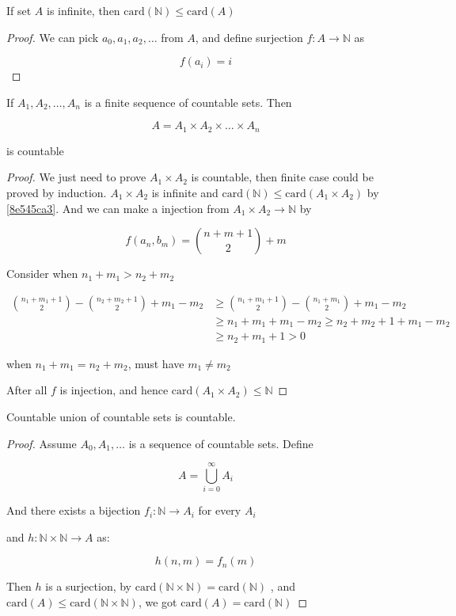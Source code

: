 \begin{thm}\label{8e545ca3}
    If set $A$ is infinite, then $\mathrm{card}(\mathbb{N}) \le \mathrm{card}(A)$
\end{thm}

\begin{proof}
    We can pick $a_0,a_1,a_2,\dots$ from $A$, and define surjection $f: A \to \mathbb{N}$ as

    \[
        f(a_i) = i
    \]
\end{proof}

\begin{thm}
    If $A_1,A_2,\dots, A_n$ is a finite sequence of countable sets. Then

    \[
        A = A_1 \times A_2 \times \dots \times A_n
    \]

    is countable
\end{thm}

\begin{proof}
    We just need to prove $A_1 \times A_2$ is countable, then finite case could be proved by induction.
    $A_1 \times A_2$ is infinite and $\mathrm{card}(\mathbb{N}) \le \mathrm{card}(A_1 \times A_2)$ by \cref{8e545ca3}.
    And we can make a injection from $A_1 \times A_2 \to \mathbb{N}$ by

    \[
        f(a_n, b_m) = \binom{n+m + 1}{2} + m
    \]

    Consider when $n_1 + m_1 > n_2 + m_2$

    \begin{align*}
        \binom{n_1 + m_1 + 1}{2} -\binom{n_2 + m_2 + 1}{2} + m_1 - m_2 & \ge \binom{n_1 + m_1+1}{2} -\binom{n_1 + m_1}{2} + m_1 - m_2 \\
        & \ge n_1 + m_1  + m_1 - m_2 \ge n_2 + m_2  + 1 + m_1 - m_2 \\
        & \ge n_2 + m_1 +1 > 0
    \end{align*}

    when $n_1 + m_1 = n_2 + m_2$, must have $m_1 \ne m_2$

    After all $f$ is injection, and hence $\mathrm{card}(A_1 \times A_2) \le \mathbb{N}$
\end{proof}

\begin{thm}
    Countable union of countable sets is countable.
\end{thm}

\begin{proof}
    Assume $A_0,A_1,\dots $ is a sequence of countable sets. Define

    \[
        A = \bigcup_{i=0}^{\infty} A_i
    \]

    And there exists a bijection $f_i: \mathbb{N} \to A_i$ for every $A_i$

    and $h: \mathbb{N} \times \mathbb{N} \to A$ as:

    \[
        h(n,m) = f_n (m)
    \]

    Then $h$ is a surjection, by $\mathrm{card}(\mathbb{N} \times \mathbb{N}) = \mathrm{card}(\mathbb{N})$ , and
    $\mathrm{card}(A) \le \mathrm{card}(\mathbb{N} \times \mathbb{N})$, we got
    $\mathrm{card}(A) = \mathrm{card}(\mathbb{N})$
\end{proof}

